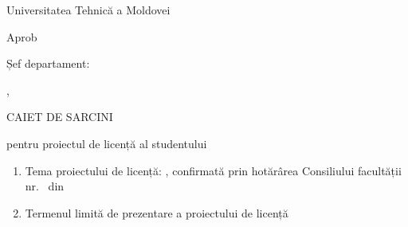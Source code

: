 


\begin{titlepage}
	\begin{titlepagefont}
	    \centering
	    \bfseries

        {\large Universitatea Tehnică a Moldovei \par}
        \bigskip
        
        \begin{minipage}{0.75\textwidth}
            {\facultyname \par}
            {\departmentname \par}
            {\programname \par}            
        \end{minipage}

    	\vfill
    	
    	\hfill
    	\begin{minipage}{0.35\textwidth}
    	    \raggedleft
        	{\small Aprob \par}
        	{\small Șef departament: \par}
        	{\small \chairmanname, \chairmantitle \par}
        	\bigskip
        	{\small \dotfill \par}
        	{\small \councildate \par}
        \end{minipage}
    	
    	\vfill
    	
    	{\large CAIET DE SARCINI \par}
    	{\large pentru proiectul de licență al studentului \par}
    	{\large \authorname \par}
    	
    	\vfill
    	
        \begin{enumerate}[label=\arabic*.]
        
            \item Tema proiectului de licență: \emph{\titlero},
            confirmată prin hotărârea Consiliului facultății nr. \emph{\councilnr}\ din \emph{\councildate}
            
            \item Termenul limită de prezentare a proiectului de licență \emph{\taskend}
            

\end{enumerate}
\end{titlepagefont}
\end{titlepage}
